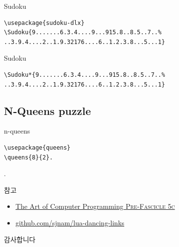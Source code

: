 \documentclass{beamer}
\begin{document}
%
\begin{frame}[fragile]{Sudoku}
\begin{verbatim}
\usepackage{sudoku-dlx}
\Sudoku{9.......6.3.4....9...915.8..8.5..7..%
..3.9.4....2..1.9.32176....6..1.2.3.8...5...1}
\end{verbatim}  

\begin{center}
\end{center}
\end{frame}

%
\begin{frame}[fragile]{Sudoku}
\begin{verbatim}
\Sudoku*{9.......6.3.4....9...915.8..8.5..7..%
..3.9.4....2..1.9.32176....6..1.2.3.8...5...1}
\end{verbatim}

\begin{center}
\end{center}
\end{frame}

\subsection{N-Queens puzzle}

%
\begin{frame}[fragile]{n-queens}
\begin{verbatim}
\usepackage{queens}
\queens{8}{2}.
\end{verbatim}
\vspace{-10mm}
.
\end{frame}

%
\begin{frame}{참고}
  \begin{itemize}
  \item \href{http://www-cs-faculty.stanford.edu/~knuth/fasc5c.ps.gz}
    {The Art of Computer Programming \textsc{Pre-Fascicle 5c}}
  \item \href{https://github.com/sjnam/lua-dancing-links}
    {github.com/sjnam/lua-dancing-links}
  \end{itemize}
\end{frame}


%
\begin{frame}[standout]
  감사합니다
\end{frame}
\end{document}
